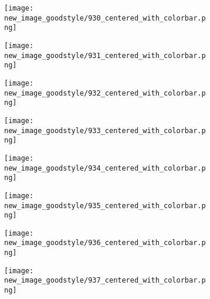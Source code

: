 \documentclass[a4paper,12pt]{article}
\begin{document}
\begin{figure}[H]
  \begin{subfigure}{0.11\textwidth}
    \texttt{[image: new\_image\_goodstyle/930\_centered\_with\_colorbar.png]}
  \end{subfigure}
  \hfill
  \begin{subfigure}{0.11\textwidth}
    \texttt{[image: new\_image\_goodstyle/931\_centered\_with\_colorbar.png]}
  \end{subfigure}
  \hfill
  \begin{subfigure}{0.11\textwidth}
    \texttt{[image: new\_image\_goodstyle/932\_centered\_with\_colorbar.png]}
  \end{subfigure}
  \hfill
  \begin{subfigure}{0.11\textwidth}
    \texttt{[image: new\_image\_goodstyle/933\_centered\_with\_colorbar.png]}
  \end{subfigure}
  \hfill
  \begin{subfigure}{0.11\textwidth}
    \texttt{[image: new\_image\_goodstyle/934\_centered\_with\_colorbar.png]}
  \end{subfigure}
  \hfill
  \begin{subfigure}{0.11\textwidth}
    \texttt{[image: new\_image\_goodstyle/935\_centered\_with\_colorbar.png]}
  \end{subfigure}
  \hfill
  \begin{subfigure}{0.11\textwidth}
    \texttt{[image: new\_image\_goodstyle/936\_centered\_with\_colorbar.png]}
  \end{subfigure}
  \hfill
  \begin{subfigure}{0.11\textwidth}
    \texttt{[image: new\_image\_goodstyle/937\_centered\_with\_colorbar.png]}
  \end{subfigure}
  \hfill
\end{figure}
\end{document}
